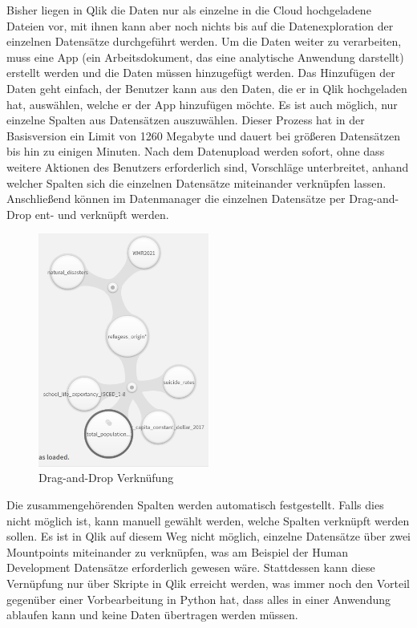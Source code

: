 \documentclass[12pt]{article}
\begin{document}
	Bisher liegen in Qlik die Daten nur als einzelne in die Cloud hochgeladene Dateien vor, mit ihnen kann aber noch nichts bis auf die Datenexploration der einzelnen Datensätze durchgeführt werden. Um die Daten weiter zu verarbeiten, muss eine App (ein Arbeitsdokument, das eine analytische Anwendung darstellt) erstellt werden und die Daten müssen hinzugefügt werden. Das Hinzufügen der Daten geht einfach, der Benutzer kann aus den Daten, die er in Qlik hochgeladen hat, auswählen, welche er der App hinzufügen möchte. Es ist auch möglich, nur einzelne Spalten aus Datensätzen auszuwählen. Dieser Prozess hat in der Basisversion ein Limit von 1260 Megabyte und dauert bei größeren Datensätzen bis hin zu einigen Minuten.
	Nach dem Datenupload werden sofort, ohne dass weitere Aktionen des Benutzers erforderlich sind, Vorschläge unterbreitet, anhand welcher Spalten sich die einzelnen Datensätze miteinander verknüpfen lassen. Anschließend können im Datenmanager die einzelnen Datensätze per Drag-and-Drop ent- und verknüpft werden.
	\begin{figure}[h]
		\centering
		\includegraphics[width=0.5\textwidth]{connect}
		\caption{Drag-and-Drop Verknüfung}
	\end{figure}
	Die zusammengehörenden Spalten werden automatisch festgestellt. Falls dies nicht möglich ist, kann manuell gewählt werden, welche Spalten verknüpft werden sollen.
	Es ist in Qlik auf diesem Weg nicht möglich, einzelne Datensätze über zwei Mountpoints miteinander zu verknüpfen, was am Beispiel der Human Development Datensätze erforderlich gewesen wäre. Stattdessen kann diese Vernüpfung nur über Skripte in Qlik erreicht werden, was immer noch den Vorteil gegenüber einer Vorbearbeitung in Python hat, dass alles in einer Anwendung ablaufen kann und keine Daten übertragen werden müssen.
\end{document}
